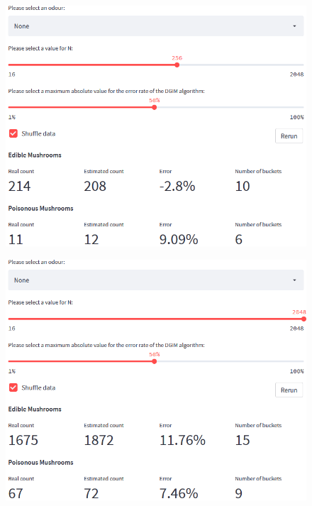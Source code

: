 \begin{frame}[plain]{}
	\begin{figure}
		\includegraphics[height=.75\linewidth]{images/typical2.png}
	\end{figure}
\end{frame}

\begin{frame}[plain]{}
	\begin{figure}
		\includegraphics[height=.75\linewidth]{images/big_n.png}
	\end{figure}
\end{frame}

